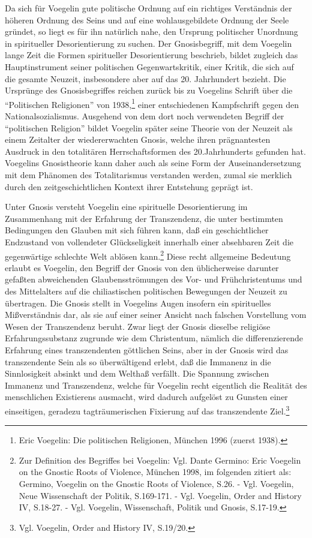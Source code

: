 Da sich für Voegelin gute politische Ordnung auf ein richtiges Verständnis der
höheren Ordnung des Seins und auf eine wohlausgebildete Ordnung der Seele
gründet, so liegt es für ihn natürlich nahe, den Ursprung politischer
Unordnung in spiritueller Desorientierung zu suchen. Der Gnosisbegriff, mit
dem Voegelin lange Zeit die Formen spiritueller Desorientierung beschrieb,
bildet zugleich das Hauptinstrument seiner politischen Gegenwartskritik, einer
Kritik, die sich auf die gesamte Neuzeit, insbesondere aber auf das 20.
Jahrhundert bezieht. Die Ursprünge des Gnosisbegriffes reichen zurück bis zu
Voegelins Schrift über die "`Politischen Religionen"' von 1938,\footnote{Eric
  Voegelin: Die politischen Religionen, München 1996 (zuerst 1938).} einer
entschiedenen Kampfschrift gegen den Nationalsozialismus. Ausgehend von dem
dort noch verwendeten Begriff der "`politischen Religion"' bildet Voegelin
später seine Theorie von der Neuzeit als einem Zeitalter der wiedererwachten
Gnosis, welche ihren prägnantesten Ausdruck in den totalitären
Herrschaftsformen des 20.Jahrhunderts gefunden hat. Voegelins Gnosistheorie
kann daher auch als seine Form der Auseinandersetzung mit dem Phänomen des
Totalitarismus verstanden werden, zumal sie merklich durch den
zeitgeschichtlichen Kontext ihrer Entstehung geprägt ist.

Unter Gnosis versteht Voegelin eine spirituelle Desorientierung im
Zusammenhang mit der Erfahrung der Transzendenz, die unter bestimmten
Bedingungen den Glauben mit sich führen kann, daß ein geschichtlicher
Endzustand von vollendeter Glückseligkeit innerhalb einer absehbaren Zeit die
gegenwärtige schlechte Welt ablösen kann.\footnote{Zur Definition des
  Begriffes bei Voegelin: Vgl. Dante Germino: Eric Voegelin on the Gnostic
  Roots of Violence, München 1998, im folgenden zitiert als: Germino, Voegelin
  on the Gnostic Roots of Violence, S.26. - Vgl. Voegelin, Neue Wissenschaft
  der Politik, S.169-171. - Vgl. Voegelin, Order and History IV, S.18-27. -
  Vgl. Voegelin, Wissenschaft, Politik und Gnosis, S.17-19.} Diese recht
allgemeine Bedeutung erlaubt es Voegelin, den Begriff der Gnosis von den
üblicherweise darunter gefaßten abweichenden Glaubensströmungen des Vor- und
Frühchristentums und des Mittelalters auf die chiliastischen politischen
Bewegungen der Neuzeit zu übertragen. Die Gnosis stellt in Voegelins Augen
insofern ein spirituelles Mißverständnis dar, als sie auf einer seiner Ansicht
nach falschen Vorstellung vom Wesen der Transzendenz beruht. Zwar liegt der
Gnosis dieselbe religiöse Erfahrungssubstanz zugrunde wie dem Christentum,
nämlich die differenzierende Erfahrung eines transzendenten göttlichen Seins,
aber in der Gnosis wird das transzendente Sein als so überwältigend erlebt,
daß die Immanenz in die Sinnlosigkeit absinkt und dem Welthaß verfällt. Die
Spannung zwischen Immanenz und Transzendenz, welche für Voegelin recht
eigentlich die Realität des menschlichen Existierens ausmacht, wird dadurch
aufgelöst zu Gunsten einer einseitigen, geradezu tagträumerischen Fixierung
auf das transzendente Ziel.\footnote{Vgl. Voegelin, Order and History IV,
  S.19/20.}

